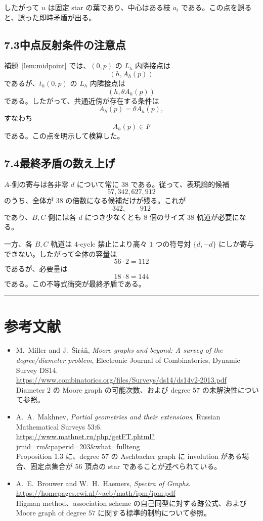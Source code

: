 \documentclass[11pt,a4paper]{article}
\theoremstyle{plain}
\theoremstyle{definition}
\theoremstyle{remark}
\begin{document}
したがって $u$ は固定 star の葉であり、中心はある枝 $a_i$ である。この点を誤ると、誤った即時矛盾が出る。

\subsection*{7.3\quad 中点反射条件の注意点}

補題~\ref{lem:midpoint} では、$(0,p)$ の $L_h$ 内隣接点は
\[
(h, A_h(p))
\]
であるが、$t_h(0,p)$ の $L_h$ 内隣接点は
\[
(h, \theta A_h(p))
\]
である。したがって、共通近傍が存在する条件は
\[
A_h(p) = \theta A_h(p),
\]
すなわち
\[
A_h(p) \in F
\]
である。この点を明示して検算した。

\subsection*{7.4\quad 最終矛盾の数え上げ}

$A$-側の寄与は各非零 $d$ について常に $38$ である。従って、表現論的候補
\[
57, 342, 627, 912
\]
のうち、全体が $38$ の倍数になる候補だけが残る。これが
\[
342, \qquad 912
\]
であり、$B,C$-側には各 $d$ につき少なくとも $8$ 個のサイズ $38$ 軌道が必要になる。

一方、各 $B,C$ 軌道は $4$-cycle 禁止により高々 $1$ つの符号対 $\{d,-d\}$ にしか寄与できない。したがって全体の容量は
\[
56 \cdot 2 = 112
\]
であるが、必要量は
\[
18 \cdot 8 = 144
\]
である。この不等式衝突が最終矛盾である。

\bigskip
\hrule
\bigskip

\section*{参考文献}

\begin{itemize}\setlength{\itemsep}{4pt}
  \item M.~Miller and J.~Širáň, \textit{Moore graphs and beyond: A survey of the degree/diameter problem}, Electronic Journal of Combinatorics, Dynamic Survey DS14.\\
  \url{https://www.combinatorics.org/files/Surveys/ds14/ds14v2-2013.pdf}\\
  Diameter $2$ の Moore graph の可能次数、および degree $57$ の未解決性について参照。
  \item A.~A.~Makhnev, \textit{Partial geometries and their extensions}, Russian Mathematical Surveys 53:6.\\
  \url{https://www.mathnet.ru/php/getFT.phtml?jrnid=rm\&paperid=203\&what=fullteng}\\
  Proposition 1.3 に、degree $57$ の Aschbacher graph に involution がある場合、固定点集合が $56$ 頂点の star であることが述べられている。
  \item A.~E.~Brouwer and W.~H.~Haemers, \textit{Spectra of Graphs}.\\
  \url{https://homepages.cwi.nl/~aeb/math/ipm/ipm.pdf}\\
  Higman method、association scheme の自己同型に対する跡公式、および Moore graph of degree $57$ に関する標準的制約について参照。
\end{itemize}
\end{document}
